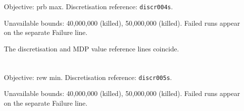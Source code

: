 \documentclass[a4paper,10pt]{article}
\begin{document}
\noindent\begin{minipage}{\linewidth}
\section*{\small\texttt{}}
Objective: prb max. Discretisation reference: \texttt{discr004s}.

\begin{minipage}[t]{0.48\linewidth}\centering

\end{minipage}
\hfill
\begin{minipage}[t]{0.48\linewidth}\centering

\end{minipage}
\par\medskip
Unavailable bounds: 40,000,000 (killed), 50,000,000 (killed). Failed runs appear on the separate Failure line.

The discretisation and MDP value reference lines coincide.

\end{minipage}\par\bigskip
\clearpage
\noindent\begin{minipage}{\linewidth}
\section*{\small\texttt{}}
Objective: rew min. Discretisation reference: \texttt{discr005s}.

\begin{minipage}[t]{0.48\linewidth}\centering

\end{minipage}
\hfill
\begin{minipage}[t]{0.48\linewidth}\centering

\end{minipage}
\par\medskip
Unavailable bounds: 40,000,000 (killed), 50,000,000 (killed). Failed runs appear on the separate Failure line.

\end{minipage}\par\bigskip
\end{document}
